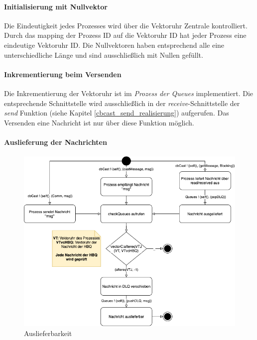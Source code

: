 \paragraph{Initialisierung mit Nullvektor}

Die Eindeutigkeit jedes Prozesses wird über die Vektoruhr Zentrale kontrolliert. Durch das mapping der Prozess ID auf die Vektoruhr ID hat jeder Prozess eine eindeutige Vektoruhr ID. Die Nullvektoren haben entsprechend alle eine unterschiedliche Länge und sind ausschließlich mit Nullen gefüllt.

\paragraph{Inkrementierung beim Versenden}

Die Inkrementierung der Vektoruhr ist im \textit{Prozess der Queues} implementiert. Die entsprechende Schnittstelle wird ausschließlich in der \textit{receive}-Schnittstelle der \textit{send} Funktion (siehe Kapitel \ref{cbcast_send_realisierung}) aufgerufen. Das Versenden eine Nachricht ist nur über diese Funktion möglich.

\paragraph{Auslieferung der Nachrichten}

\begin{figure}[htbp]
\begin{center}
\includegraphics[scale=0.45]{Latex/Bilder/Auslieferbarkeit.png}
\caption{\label{auslieferbarkeit_analyse} Auslieferbarkeit}
\end{center}
\end{figure}

